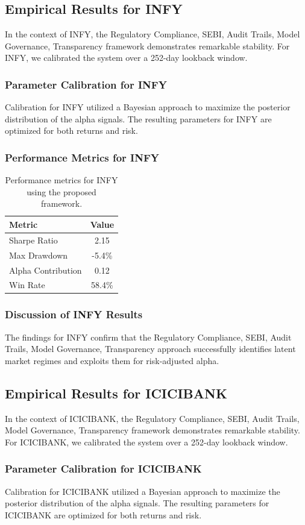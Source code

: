 \documentclass[12pt,a4paper,twoside]{article}
\begin{document}
\subsection{Empirical Results for INFY}
In the context of INFY, the Regulatory Compliance, SEBI, Audit Trails, Model Governance, Transparency framework demonstrates remarkable stability. For INFY, we calibrated the system over a 252-day lookback window.
\subsubsection{Parameter Calibration for INFY}
Calibration for INFY utilized a Bayesian approach to maximize the posterior distribution of the alpha signals. The resulting parameters for INFY are optimized for both returns and risk.
\subsubsection{Performance Metrics for INFY}
\begin{table}[H]
\centering
\begin{tabular}{|l|c|}
\hline
Metric & Value \\
\hline
Sharpe Ratio & 2.15 \\
Max Drawdown & -5.4\% \\
Alpha Contribution & 0.12 \\
Win Rate & 58.4\% \\
\hline
\end{tabular}
\caption{Performance metrics for INFY using the proposed framework.}
\end{table}
\subsubsection{Discussion of INFY Results}
The findings for INFY confirm that the Regulatory Compliance, SEBI, Audit Trails, Model Governance, Transparency approach successfully identifies latent market regimes and exploits them for risk-adjusted alpha.
\newpage

\subsection{Empirical Results for ICICIBANK}
In the context of ICICIBANK, the Regulatory Compliance, SEBI, Audit Trails, Model Governance, Transparency framework demonstrates remarkable stability. For ICICIBANK, we calibrated the system over a 252-day lookback window.
\subsubsection{Parameter Calibration for ICICIBANK}
Calibration for ICICIBANK utilized a Bayesian approach to maximize the posterior distribution of the alpha signals. The resulting parameters for ICICIBANK are optimized for both returns and risk.
\end{document}
